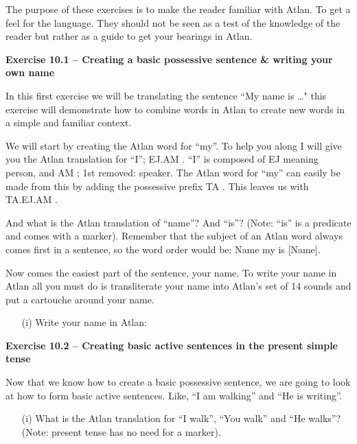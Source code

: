 

The purpose of these exercises is to make the reader familiar with Atlan. To get a feel for the language. They should not be seen as a test of the knowledge of the reader but rather as a guide to get your bearings in Atlan.  


\noindent \textbf{Exercise 10.1 -- Creating a basic possessive sentence \& writing your own name} 

In this first exercise we will be translating the sentence “My name is …" this exercise will demonstrate how to combine words in Atlan to create new words in a simple and familiar context. 

We will start by creating the Atlan word for “my”. To help you along I will give you the Atlan translation for “I”; EJ.AM \ej\am. “I” is composed of EJ \ej meaning person, and AM \am; 1st removed: speaker. The Atlan word for “my” can easily be made from this by adding the possessive prefix TA \ta. This leaves us with TA.EJ.AM \ta\ej\am.  

And what is the Atlan translation of “name”? And “is”? (Note: “is” is a predicate and comes with a marker). Remember that the subject of an Atlan word always comes first in a sentence, so the word order would be: Name my is [Name]. 

Now comes the easiest part of the sentence, your name. To write your name in Atlan all you must do is transliterate your name into Atlan’s set of 14 sounds and put a cartouche around your name. %
\begin{itemize}
	\item[(i)] Write your name in Atlan:
	\vspace{0.3cm}
	\dotfill
\end{itemize}

\noindent \textbf{Exercise 10.2 -- Creating basic active sentences in the present simple tense} 

Now that we know how to create a basic possessive sentence, we are going to look at how to form basic active sentences. Like, “I am walking” and “He is writing”.  
\begin{itemize}
\item[(i)] What is the Atlan translation for “I walk”, “You walk” and “He walks”? (Note: present tense has no need for a marker).  
\end{itemize}

